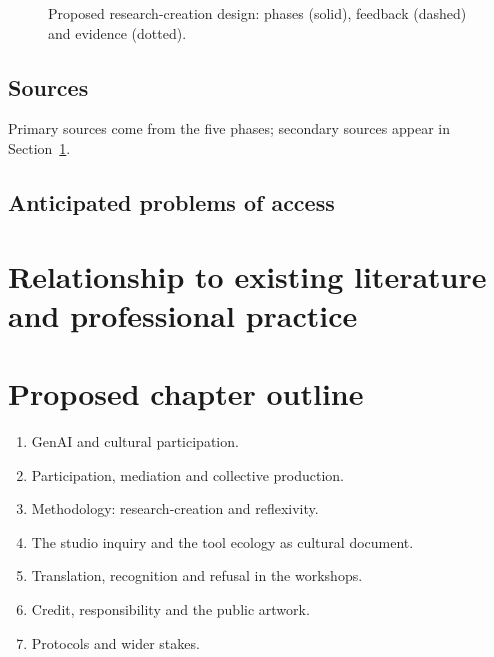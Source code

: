\documentclass[letterpaper,12pt]{article}
\begin{document}
\begin{figure}[ht]
\centering
{}

\caption{Proposed research-creation design: phases (solid), feedback
(dashed) and evidence (dotted).}
\label{fig:overview}
\end{figure}





\subsection{Sources}
Primary sources come from the five phases; secondary sources appear in
Section~\ref{sec:lit}.

\subsection{Anticipated problems of access}


\section{Relationship to existing literature and professional practice}\label{sec:lit}






\section{Proposed chapter outline}
\enlargethispage{\baselineskip}

\begin{enumerate}[label=\arabic*., leftmargin=*, itemsep=0pt]
  \item GenAI and cultural participation.
  \item Participation, mediation and collective production.
  \item Methodology: research-creation and reflexivity.
  \item The studio inquiry and the tool ecology as cultural document.
  \item Translation, recognition and refusal in the workshops.
  \item Credit, responsibility and the public artwork.
  \item Protocols and wider stakes.
\end{enumerate}
\end{document}
